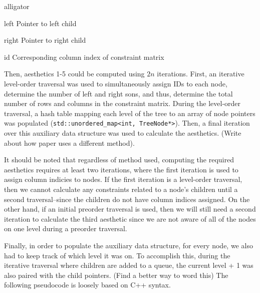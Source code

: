 \documentclass[11pt]{report}
\begin{document}
\begin{labeling}{alligator}
    \item [left]  Pointer to left child
    \item [right] Pointer to right child
    \item [id]    Corresponding column index of constraint matrix
\end{labeling}

Then, aesthetics 1-5 could be computed using $2n$ iterations. First, an iterative level-order traversal was used to simultaneously assign IDs to each node, determine the number of left and right sons, and thus, determine the total number of rows and columns in the constraint matrix. During the level-order traversal, a hash table mapping each level of the tree to an array of node pointers was populated (\lstinline{std::unordered_map<int, TreeNode*>}). Then, a final iteration over this auxiliary data structure was used to calculate the aesthetics. (Write about how paper uses a different method).

\bigskip

It should be noted that regardless of method used, computing the required aesthetics requires at least two iterations, where the first iteration is used to assign column indicies to nodes. If the first iteration is a level-order traversal, then we cannot calculate any constraints related to a node's children until a second traversal--since the children do not have column indices assigned. On the other hand, if an initial preorder traversal is used, then we will still need a second iteration to calculate the third aesthetic since we are not aware of all of the nodes on one level during a preorder traversal.

\bigskip

Finally, in order to populate the auxiliary data structure, for every node, we also had to keep track of which level it was on. To accomplish this, during the iterative traversal where children are added to a queue, the current level + 1 was also paired with the child pointers. (Find a better way to word this) The following pseudocode is loosely based on C++ syntax.
\end{document}
